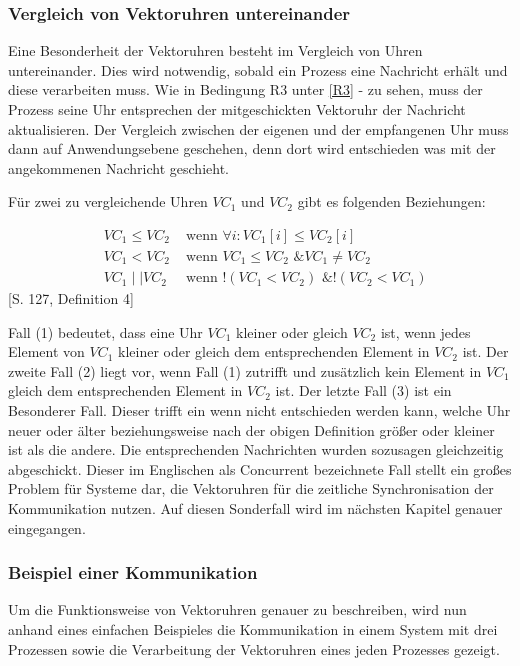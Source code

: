 \subsubsection{Vergleich von Vektoruhren untereinander}
Eine Besonderheit der Vektoruhren besteht im Vergleich von Uhren untereinander. Dies wird notwendig, sobald ein Prozess eine Nachricht erhält und diese verarbeiten muss. Wie in Bedingung R3 unter \ref{R3} -  zu sehen, muss der Prozess seine Uhr entsprechen der mitgeschickten Vektoruhr der Nachricht aktualisieren. Der Vergleich zwischen der eigenen und der empfangenen Uhr muss dann auf Anwendungsebene geschehen, denn dort wird entschieden was mit der angekommenen Nachricht geschieht.

Für zwei zu vergleichende Uhren $VC_1$ und $VC_2$ gibt es folgenden Beziehungen:

\begin{eqnarray}
&VC_1 \leq VC_2& \text{ wenn } \forall i : VC_1[i] \leq VC_2[i] \\
	&VC_1 < VC_2& \text{ wenn } VC_1 \leq VC_2 \text{ \& } VC_1 \neq VC_2 \\
	&VC_1 \mid \mid VC_2& \text{ wenn } !(VC_1 < VC_2) \text{ \& } !(VC_2 < VC_1)
\end{eqnarray}
\cite{Mattern88virtualtime}[S. 127, Definition 4]

Fall (1) bedeutet, dass eine Uhr $VC_1$ kleiner oder gleich $VC_2$ ist, wenn jedes Element von $VC_1$ kleiner oder gleich dem entsprechenden Element in $VC_2$ ist. Der zweite Fall (2) liegt vor, wenn Fall (1) zutrifft und zusätzlich kein Element in $VC_1$ gleich dem entsprechenden Element in $VC_2$ ist. 
Der letzte Fall (3) ist ein Besonderer Fall. Dieser trifft ein wenn nicht entschieden werden kann, welche Uhr neuer oder älter beziehungsweise nach der obigen Definition größer oder kleiner ist als die andere. Die entsprechenden Nachrichten wurden sozusagen gleichzeitig abgeschickt. Dieser im Englischen als \glqq Concurrent\glqq{} bezeichnete Fall stellt ein großes Problem für Systeme dar, die Vektoruhren für die zeitliche Synchronisation der Kommunikation nutzen. Auf diesen Sonderfall wird im nächsten Kapitel genauer eingegangen.
\subsubsection{Beispiel einer Kommunikation}
Um die Funktionsweise von Vektoruhren genauer zu beschreiben, wird nun anhand eines einfachen Beispieles die Kommunikation in einem System mit drei Prozessen sowie die Verarbeitung der Vektoruhren eines jeden Prozesses gezeigt.

